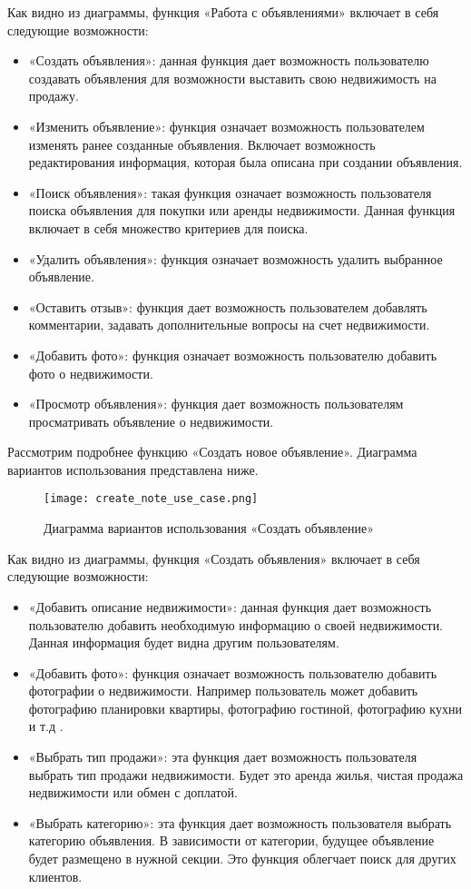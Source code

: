 Как видно из диаграммы, функция «Работа с объявлениями» включает в себя следующие возможности:

\begin{itemize}
	\item «Создать объявления»: данная функция дает возможность пользователю создавать объявления для возможности выставить свою недвижимость на продажу. 
	\item «Изменить объявление»: функция означает возможность пользователем изменять ранее созданные объявления. Включает возможность редактирования информация, которая была описана при создании объявления.
	\item «Поиск объявления»: такая функция означает возможность пользователя поиска объявления для покупки или аренды недвижимости. Данная функция включает в себя множество критериев для поиска.
	\item «Удалить объявления»: функция означает возможность удалить выбранное объявление.
	\item «Оставить отзыв»: функция дает возможность пользователем добавлять комментарии, задавать дополнительные вопросы на счет недвижимости.
	\item «Добавить фото»: функция означает возможность пользователю добавить фото о недвижимости.
	\item «Просмотр объявления»: функция дает возможность пользователям просматривать объявление о недвижимости.
\end{itemize}

Рассмотрим подробнее функцию «Создать новое объявление». Диаграмма вариантов использования представлена ниже.


\begin{figure}[!htb]
	\centering
	\texttt{[image: create\_note\_use\_case.png]}
	\caption{ Диаграмма вариантов использования «Создать объявление»}
	\label{fig:arch_and_mod::lexer_flow}
	\clearpage
\end{figure}

Как видно из диаграммы, функция «Создать объявления» включает в себя следующие возможности:

\begin{itemize}
	\item «Добавить описание недвижимости»: данная функция дает возможность пользователю добавить необходимую информацию о своей недвижимости. Данная информация будет видна другим пользователям.  
	\item «Добавить фото»: функция означает возможность пользователю добавить фотографии о недвижимости. Например пользователь может добавить фотографию планировки квартиры, фотографию гостиной, фотографию кухни и т.д .
	\item «Выбрать тип продажи»: эта функция дает возможность пользователя выбрать тип продажи недвижимости. Будет это аренда жилья, чистая продажа недвижимости или обмен с доплатой.
	\item «Выбрать категорию»: эта функция дает возможность пользователя выбрать категорию объявления. В зависимости от категории, будущее объявление будет размещено в нужной секции. Это функция облегчает поиск для других клиентов.
\end{itemize}

